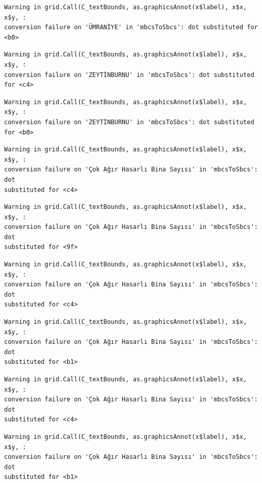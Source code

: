 \documentclass[
  11pt,
  a4paper,
  DIV=11,
  numbers=noendperiod]{scrartcl}
\begin{document}
\begin{verbatim}
Warning in grid.Call(C_textBounds, as.graphicsAnnot(x$label), x$x, x$y, :
conversion failure on 'ÜMRANİYE' in 'mbcsToSbcs': dot substituted for <b0>
\end{verbatim}

\begin{verbatim}
Warning in grid.Call(C_textBounds, as.graphicsAnnot(x$label), x$x, x$y, :
conversion failure on 'ZEYTİNBURNU' in 'mbcsToSbcs': dot substituted for <c4>
\end{verbatim}

\begin{verbatim}
Warning in grid.Call(C_textBounds, as.graphicsAnnot(x$label), x$x, x$y, :
conversion failure on 'ZEYTİNBURNU' in 'mbcsToSbcs': dot substituted for <b0>
\end{verbatim}

\begin{verbatim}
Warning in grid.Call(C_textBounds, as.graphicsAnnot(x$label), x$x, x$y, :
conversion failure on 'Çok Ağır Hasarlı Bina Sayısı' in 'mbcsToSbcs': dot
substituted for <c4>
\end{verbatim}

\begin{verbatim}
Warning in grid.Call(C_textBounds, as.graphicsAnnot(x$label), x$x, x$y, :
conversion failure on 'Çok Ağır Hasarlı Bina Sayısı' in 'mbcsToSbcs': dot
substituted for <9f>
\end{verbatim}

\begin{verbatim}
Warning in grid.Call(C_textBounds, as.graphicsAnnot(x$label), x$x, x$y, :
conversion failure on 'Çok Ağır Hasarlı Bina Sayısı' in 'mbcsToSbcs': dot
substituted for <c4>
\end{verbatim}

\begin{verbatim}
Warning in grid.Call(C_textBounds, as.graphicsAnnot(x$label), x$x, x$y, :
conversion failure on 'Çok Ağır Hasarlı Bina Sayısı' in 'mbcsToSbcs': dot
substituted for <b1>
\end{verbatim}

\begin{verbatim}
Warning in grid.Call(C_textBounds, as.graphicsAnnot(x$label), x$x, x$y, :
conversion failure on 'Çok Ağır Hasarlı Bina Sayısı' in 'mbcsToSbcs': dot
substituted for <c4>
\end{verbatim}

\begin{verbatim}
Warning in grid.Call(C_textBounds, as.graphicsAnnot(x$label), x$x, x$y, :
conversion failure on 'Çok Ağır Hasarlı Bina Sayısı' in 'mbcsToSbcs': dot
substituted for <b1>
\end{verbatim}
\end{document}
